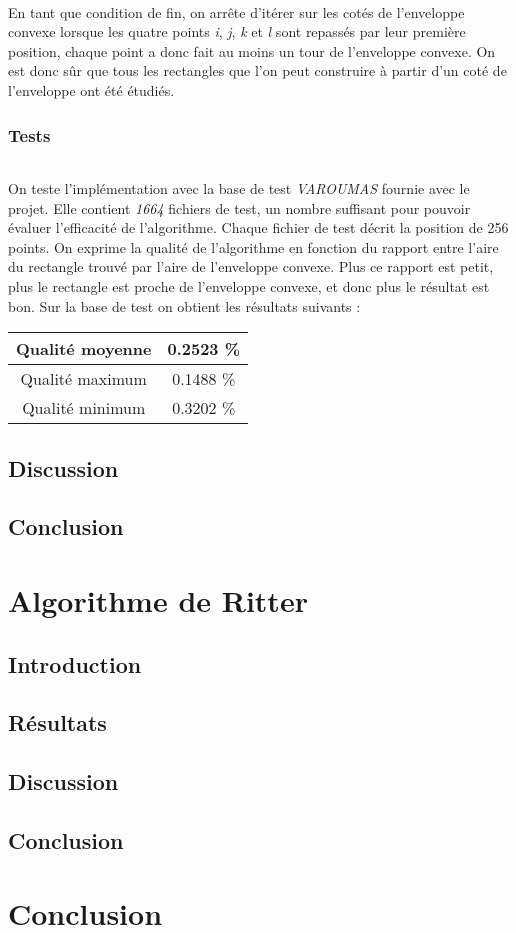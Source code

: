 \documentclass[11pt]{report}
\begin{document}
\subparagraph{}
En tant que condition de fin, on arrête d'itérer sur les cotés de l'enveloppe convexe lorsque les quatre points \emph{i}, \emph{j}, \emph{k} et \emph{l} sont repassés par leur première position, chaque point a donc fait au moins un tour de l'enveloppe convexe. On est donc sûr que tous les rectangles que l'on peut construire à partir d'un coté de l'enveloppe ont été étudiés. 
\subsection{Tests}
\paragraph{}
\subparagraph{}
On teste l'implémentation avec la base de test \emph{VAROUMAS} fournie avec le projet. Elle contient \emph{1664} fichiers de test, un nombre suffisant pour pouvoir évaluer l'efficacité de l'algorithme. Chaque fichier de test décrit la position de 256 points. On exprime la qualité de l'algorithme en fonction du rapport entre l'aire du rectangle trouvé par l'aire de l'enveloppe convexe. Plus ce rapport est petit, plus le rectangle est proche de l'enveloppe convexe, et donc plus le résultat est bon. Sur la base de test on obtient les résultats suivants : 
\begin{center}
\begin{tabular}{|| c | c ||}
\hline
Qualité moyenne & 0.2523 \%\\ \hline
Qualité maximum & 0.1488 \%\\ \hline
Qualité minimum & 0.3202 \%\\ \hline
\end{tabular}
\end{center}
\section{Discussion}
\section{Conclusion}
\chapter{Algorithme de Ritter}
\section{Introduction}
\section{Résultats}
\section{Discussion}
\section{Conclusion}
\chapter{Conclusion}
\end{document}
